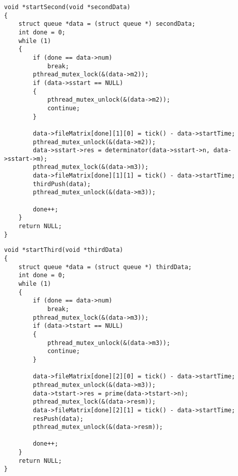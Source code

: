 \begin{lstlisting}[caption=Вторая лента конвейера]
void *startSecond(void *secondData)
{
	struct queue *data = (struct queue *) secondData;
	int done = 0;
	while (1)
	{
		if (done == data->num)
			break;
		pthread_mutex_lock(&(data->m2));
		if (data->sstart == NULL)
		{
			pthread_mutex_unlock(&(data->m2));
			continue;
		}
		
		data->fileMatrix[done][1][0] = tick() - data->startTime;
		pthread_mutex_unlock(&(data->m2));
		data->sstart->res = determinator(data->sstart->n, data->sstart->m);
		pthread_mutex_lock(&(data->m3));
		data->fileMatrix[done][1][1] = tick() - data->startTime;
		thirdPush(data);
		pthread_mutex_unlock(&(data->m3));
		
		done++;
	}
	return NULL;
}
\end{lstlisting}

\begin{lstlisting}[caption=Третья лента конвейера]
void *startThird(void *thirdData)
{
	struct queue *data = (struct queue *) thirdData;
	int done = 0;
	while (1)
	{
		if (done == data->num)
			break;
		pthread_mutex_lock(&(data->m3));
		if (data->tstart == NULL)
		{
			pthread_mutex_unlock(&(data->m3));
			continue;
		}
		
		data->fileMatrix[done][2][0] = tick() - data->startTime;
		pthread_mutex_unlock(&(data->m3));
		data->tstart->res = prime(data->tstart->n);
		pthread_mutex_lock(&(data->resm));
		data->fileMatrix[done][2][1] = tick() - data->startTime;
		resPush(data);
		pthread_mutex_unlock(&(data->resm));
		
		done++;
	}
	return NULL;
}
\end{lstlisting}

